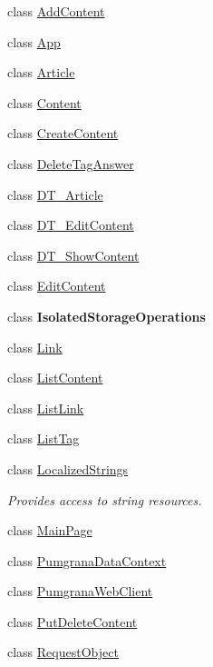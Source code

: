 \begin{DoxyCompactItemize}
\item 
class \hyperlink{class_pumgrana_1_1_add_content}{Add\+Content}
\item 
class \hyperlink{class_pumgrana_1_1_app}{App}
\item 
class \hyperlink{class_pumgrana_1_1_article}{Article}
\item 
class \hyperlink{class_pumgrana_1_1_content}{Content}
\item 
class \hyperlink{class_pumgrana_1_1_create_content}{Create\+Content}
\item 
class \hyperlink{class_pumgrana_1_1_delete_tag_answer}{Delete\+Tag\+Answer}
\item 
class \hyperlink{class_pumgrana_1_1_d_t___article}{D\+T\+\_\+\+Article}
\item 
class \hyperlink{class_pumgrana_1_1_d_t___edit_content}{D\+T\+\_\+\+Edit\+Content}
\item 
class \hyperlink{class_pumgrana_1_1_d_t___show_content}{D\+T\+\_\+\+Show\+Content}
\item 
class \hyperlink{class_pumgrana_1_1_edit_content}{Edit\+Content}
\item 
class {\bfseries Isolated\+Storage\+Operations}
\item 
class \hyperlink{class_pumgrana_1_1_link}{Link}
\item 
class \hyperlink{class_pumgrana_1_1_list_content}{List\+Content}
\item 
class \hyperlink{class_pumgrana_1_1_list_link}{List\+Link}
\item 
class \hyperlink{class_pumgrana_1_1_list_tag}{List\+Tag}
\item 
class \hyperlink{class_pumgrana_1_1_localized_strings}{Localized\+Strings}
\begin{DoxyCompactList}\small\item\em Provides access to string resources. \end{DoxyCompactList}\item 
class \hyperlink{class_pumgrana_1_1_main_page}{Main\+Page}
\item 
class \hyperlink{class_pumgrana_1_1_pumgrana_data_context}{Pumgrana\+Data\+Context}
\item 
class \hyperlink{class_pumgrana_1_1_pumgrana_web_client}{Pumgrana\+Web\+Client}
\item 
class \hyperlink{class_pumgrana_1_1_put_delete_content}{Put\+Delete\+Content}
\item 
class \hyperlink{class_pumgrana_1_1_request_object}{Request\+Object}

\end{DoxyCompactItemize}
